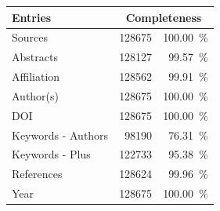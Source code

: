 \begin{tabular}{lrr} \toprule
Entries & \multicolumn{2}{c}{Completeness} \\ \midrule
Sources              & \num{128675} & \SI{100.00}{\percent} \\
Abstracts            & \num{128127} & \SI{99.57}{\percent} \\
Affiliation          & \num{128562} & \SI{99.91}{\percent} \\
Author(s)            & \num{128675} & \SI{100.00}{\percent} \\
DOI                  & \num{128675} & \SI{100.00}{\percent} \\
Keywords - Authors   & \num{98190} & \SI{76.31}{\percent} \\
Keywords - Plus      & \num{122733} & \SI{95.38}{\percent} \\
References           & \num{128624} & \SI{99.96}{\percent} \\
Year                 & \num{128675} & \SI{100.00}{\percent} \\
\bottomrule
\end{tabular}